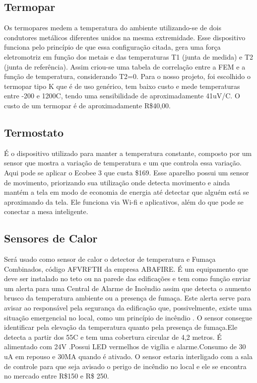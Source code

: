 \subsection{Termopar}

Os termopares medem a temperatura do ambiente utilizando-se de dois condutores metálicos diferentes unidos na mesma extremidade. Esse dispositivo funciona pelo princípio de que essa configuração citada, gera uma força eletromotriz em função dos metais e das temperaturas T1 (junta de medida) e T2 (junta de referência). Assim criou-se uma tabela de correlação entre a FEM e a função de temperatura, considerando T2=0. Para o nosso projeto, foi escolhido o termopar tipo K que é de uso genérico, tem baixo custo e mede temperaturas entre -200 e 1200C, tendo uma sensibilidade de aproximadamente 41uV/C. O custo de um termopar é de aproximadamente R\$40,00.

\subsection{Termostato}

É o dispositivo utilizado para manter a temperatura constante, composto por um sensor que mostra a variação de temperatura e um que controla essa variação. Aqui pode se aplicar o Ecobee 3 que custa \$169. Esse aparelho possui um sensor de movimento, priorizando sua utilização onde detecta movimento e ainda mantém a tela em modo de economia de energia até detectar que alguém está se aproximando da tela. Ele funciona via Wi-fi e aplicativos, além do que pode se conectar a mesa inteligente.

\subsection{Sensores de Calor}

Será usado como sensor de calor o detector de temperatura e Fumaça Combinados, código AFVRFTH da empresa ABAFIRE. É um equipamento que deve ser instalado no teto ou na parede das edificações e tem como função enviar um alerta para uma Central de Alarme de Incêndio assim que detecta o aumento brusco da temperatura ambiente ou a presença de fumaça. Este alerta serve para avisar ao responsável pela segurança da edificação que, possivelmente, existe uma situação emergencial no local, como um princípio de incêndio . O sensor consegue identificar pela elevação da temperatura quanto pela presença de fumaça.Ele detecta a partir dos 55C e tem uma cobertura circular de 4,2 metros. É alimentado com 24V .Possui LED vermelhos de vigília e alarme.Consumo de 30 uA em repouso e 30MA quando é ativado. O sensor estaria interligado com a sala de controle para que seja avisado o perigo de incêndio no local e ele se encontra no mercado entre R\$150 e R\$ 250. 

